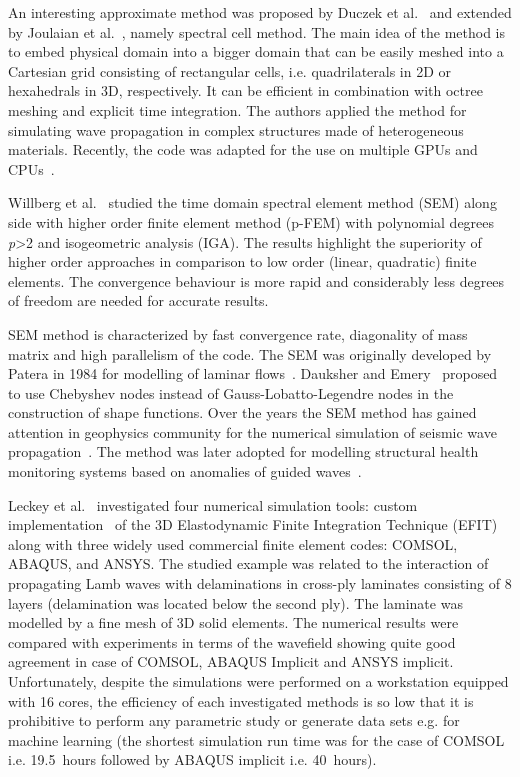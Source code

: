 \documentclass[preprint,12pt]{elsarticle}
\begin{document}
	An interesting approximate method was proposed by Duczek et al.~\cite{Duczek2014} and extended by Joulaian et al.~\cite{Joulaian2014}, namely spectral cell method. The main idea of the method is to embed physical domain into a bigger domain that can be easily meshed into a Cartesian grid consisting of rectangular cells, i.e. quadrilaterals in 2D or hexahedrals in 3D, respectively. It can be efficient in combination with octree meshing and explicit time integration. The authors applied the method for simulating wave propagation in complex structures made of heterogeneous materials. Recently, the code was adapted for the use on multiple GPUs and CPUs~\cite{Mossaiby2019}. 
	
	Willberg et al.~\cite{Willberg2012} studied the time domain spectral element method (SEM) along side with higher order finite element method (p-FEM) with polynomial degrees \emph{p}{\textgreater}2 and isogeometric analysis (IGA). The results highlight the superiority of higher order approaches in comparison to low order (linear, quadratic) finite elements. The convergence behaviour is more rapid and considerably less degrees of freedom are needed for accurate results.
	
	SEM method is characterized by fast convergence rate, diagonality of mass matrix and high parallelism of the code. The SEM was originally developed by Patera in 1984 for modelling of laminar flows~\cite{Patera1984}. Dauksher and Emery~\cite{Dauksher1997,Dauksher2000} proposed to use Chebyshev nodes instead of Gauss-Lobatto-Legendre nodes in the construction of shape functions. Over the years the SEM method has gained attention in geophysics community for the numerical simulation of seismic wave propagation~\cite{Seriani1998,Komatitsch2009}. The method was later adopted for modelling structural health monitoring systems based on anomalies of guided waves~\cite{Schulte2010,Ostachowicz2012,Lonkar2013}. 
	
	Leckey et al.~\cite{Leckey2018} investigated four numerical simulation tools: custom implementation~\cite{Leckey2014} of the 3D Elastodynamic Finite Integration Technique (EFIT) \cite{Schubert1998} along with three widely used commercial finite element codes: COMSOL, ABAQUS, and ANSYS. The studied example was related to the interaction of propagating Lamb waves with delaminations in cross-ply laminates consisting of 8 layers (delamination was located below the second ply). The laminate was modelled by a fine mesh of 3D solid elements. The numerical results were compared with experiments in terms of the wavefield showing quite good agreement in case of COMSOL, ABAQUS Implicit and ANSYS implicit. Unfortunately, despite the simulations were performed on a workstation equipped with 16 cores, the efficiency of each investigated methods is so low that it is prohibitive to perform any parametric study or generate data sets e.g. for machine learning (the shortest simulation run time was for the case of COMSOL i.e. 19.5~hours followed by ABAQUS implicit i.e. 40~hours).
	
\end{document}
